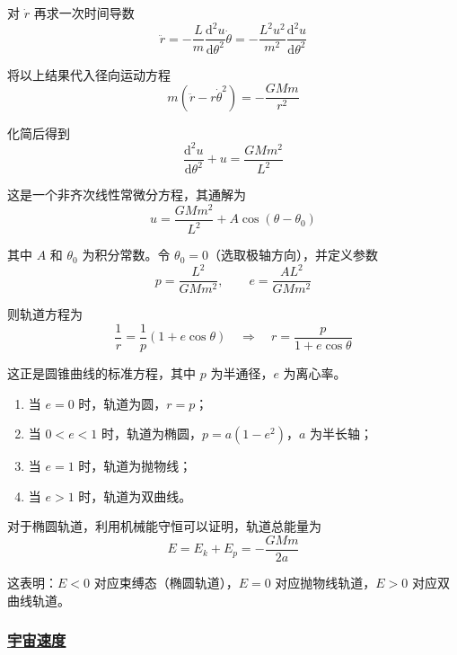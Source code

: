 对 $\dot{r}$ 再求一次时间导数
\begin{equation}
    \ddot{r} = -\frac{L}{m}\frac{\mathrm{d}^2 u}{\mathrm{d}\theta^2}\dot{\theta} = -\frac{L^2 u^2}{m^2}\frac{\mathrm{d}^2 u}{\mathrm{d}\theta^2}
\end{equation}

将以上结果代入径向运动方程
\begin{equation}
    m(\ddot{r} - r\dot{\theta}^2) = -\frac{GMm}{r^2}
\end{equation}

化简后得到
\begin{equation}
    \frac{\mathrm{d}^2 u}{\mathrm{d}\theta^2} + u = \frac{GMm^2}{L^2}
\end{equation}

这是一个非齐次线性常微分方程，其通解为
\begin{equation}
    u = \frac{GMm^2}{L^2} + A\cos(\theta - \theta_0)
\end{equation}

其中 $A$ 和 $\theta_0$ 为积分常数。令 $\theta_0 = 0$（选取极轴方向），并定义参数
\begin{equation}
    p = \frac{L^2}{GMm^2}, \qquad e = \frac{AL^2}{GMm^2}
\end{equation}

则轨道方程为
\begin{equation}
    \frac{1}{r} = \frac{1}{p}(1 + e\cos\theta) \quad \Longrightarrow \quad r = \frac{p}{1 + e\cos\theta}
\end{equation}

这正是圆锥曲线的标准方程，其中 $p$ 为半通径，$e$ 为离心率。

\begin{enumerate}
    \item 当 $e = 0$ 时，轨道为圆，$r = p$；
    \item 当 $0 < e < 1$ 时，轨道为椭圆，$p = a(1-e^2)$，$a$ 为半长轴；
    \item 当 $e = 1$ 时，轨道为抛物线；
    \item 当 $e > 1$ 时，轨道为双曲线。
\end{enumerate}

对于椭圆轨道，利用机械能守恒可以证明，轨道总能量为
\begin{equation}
    E = E_k + E_p = -\frac{GMm}{2a}
\end{equation}

这表明：$E < 0$ 对应束缚态（椭圆轨道），$E = 0$ 对应抛物线轨道，$E > 0$ 对应双曲线轨道。

\subsubsection{\protect\hyperlink{:}{宇宙速度}}

